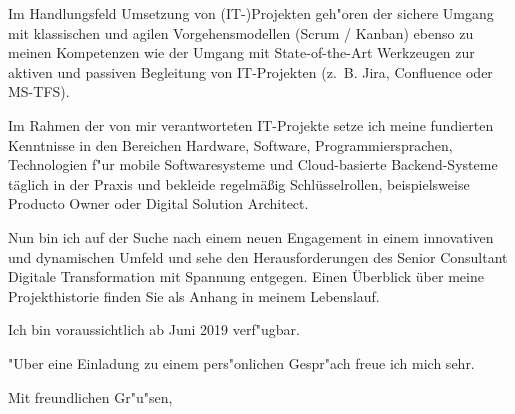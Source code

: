 \documentclass[11pt,a4paper]{dinbrief}
\begin{document}
\begin{letter}
Im Handlungsfeld Umsetzung von (IT-)Projekten geh"oren der sichere Umgang mit klassischen und agilen Vorgehensmodellen (Scrum / Kanban) ebenso zu meinen Kompetenzen wie der Umgang mit State-of-the-Art Werkzeugen zur aktiven und passiven Begleitung von IT-Projekten (z.~B. Jira, Confluence oder MS-TFS). 

Im Rahmen der von mir verantworteten IT-Projekte setze ich meine fundierten Kenntnisse in den Bereichen Hardware, Software, Programmiersprachen, Technologien f"ur mobile Softwaresysteme und Cloud-basierte Backend-Systeme täglich in der Praxis und bekleide regelmäßig Schlüsselrollen, beispielsweise Producto Owner oder Digital Solution Architect.


Nun bin ich auf der Suche nach einem neuen Engagement in einem innovativen und dynamischen Umfeld und sehe den Herausforderungen des Senior Consultant Digitale Transformation mit Spannung entgegen. Einen Überblick über meine Projekthistorie finden Sie als Anhang in meinem Lebenslauf.


Ich bin voraussichtlich ab Juni 2019 verf"ugbar.

"Uber eine Einladung zu einem pers"onlichen Gespr"ach freue ich mich sehr.

\closing{Mit freundlichen Gr"u"sen,}
\end{letter}
\end{document}
